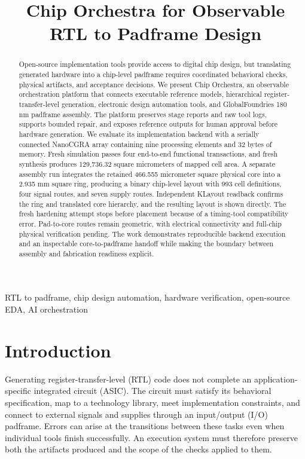 \documentclass[conference,letterpaper]{IEEEtran}
\title{Chip Orchestra for Observable RTL to Padframe Design}
\author{\IEEEauthorblockN{Ade Irman Budi Hendrawan, William Anthony, Rifky Afriadi, Radhian Ferel Armansyah}
\IEEEauthorblockA{School of Electrical Engineering and Informatics\\Bandung Institute of Technology (ITB)\\Bandung, Indonesia\\
\{adeirman2705, willomooi, rifki.afriyadi, radhianarmansyah\}@gmail.com}}
\begin{document}
\maketitle
\begin{abstract}
Open-source implementation tools provide access to digital chip design, but translating generated hardware into a chip-level padframe requires coordinated behavioral checks, physical artifacts, and acceptance decisions. We present Chip Orchestra, an observable orchestration platform that connects executable reference models, hierarchical register-transfer-level generation, electronic design automation tools, and GlobalFoundries 180 nm padframe assembly. The platform preserves stage reports and raw tool logs, supports bounded repair, and exposes reference outputs for human approval before hardware generation. We evaluate its implementation backend with a serially connected NanoCGRA array containing nine processing elements and 32 bytes of memory. Fresh simulation passes four end-to-end functional transactions, and fresh synthesis produces 129,736.32 square micrometers of mapped cell area. A separate assembly run integrates the retained 466.555 micrometer square physical core into a 2.935 mm square ring, producing a binary chip-level layout with 993 cell definitions, four signal routes, and seven supply routes. Independent KLayout readback confirms the ring and translated core hierarchy, and the resulting layout is shown directly. The fresh hardening attempt stops before placement because of a timing-tool compatibility error. Pad-to-core routes remain geometric, with electrical connectivity and full-chip physical verification pending. The work demonstrates reproducible backend execution and an inspectable core-to-padframe handoff while making the boundary between assembly and fabrication readiness explicit.
\end{abstract}
\begin{IEEEkeywords}
RTL to padframe, chip design automation, hardware verification, open-source EDA, AI orchestration
\end{IEEEkeywords}

\section{Introduction}
Generating register-transfer-level (RTL) code does not complete an application-specific integrated circuit (ASIC). The circuit must satisfy its behavioral specification, map to a technology library, meet implementation constraints, and connect to external signals and supplies through an input/output (I/O) padframe. Errors can arise at the transitions between these tasks even when individual tools finish successfully. An execution system must therefore preserve both the artifacts produced and the scope of the checks applied to them.
\end{document}
